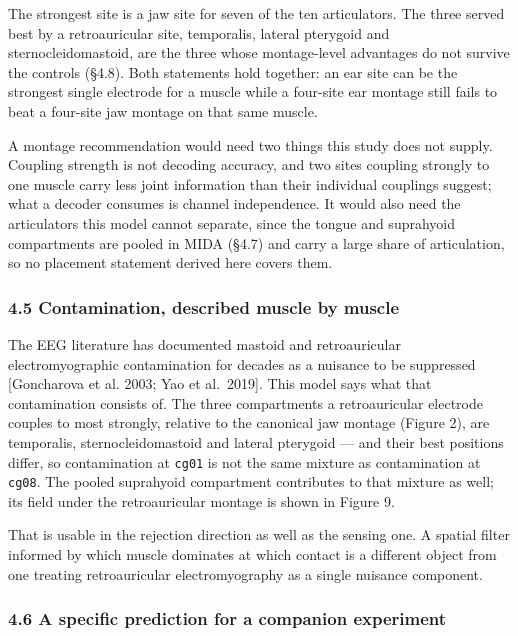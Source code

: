 \documentclass[
  11pt,
  letterpaper,
]{article}
\begin{document}
The strongest site is a jaw site for seven of the ten articulators. The three
served best by a retroauricular site, temporalis, lateral pterygoid and
sternocleidomastoid, are the three whose montage-level advantages do not survive
the controls (\S{}4.8). Both statements hold together: an ear site can be the
strongest single electrode for a muscle while a four-site ear montage still
fails to beat a four-site jaw montage on that same muscle.

A montage recommendation would need two things this study does not supply.
Coupling strength is not decoding accuracy, and two sites coupling strongly to
one muscle carry less joint information than their individual couplings suggest;
what a decoder consumes is channel independence. It would also need the
articulators this model cannot separate, since the tongue and suprahyoid
compartments are pooled in MIDA (\S{}4.7) and carry a large share of articulation,
so no placement statement derived here covers them.

\subsubsection{4.5 Contamination, described muscle by muscle}\label{contamination-described-muscle-by-muscle}

The EEG literature has documented mastoid and retroauricular electromyographic
contamination for decades as a nuisance to be suppressed {[}Goncharova et al.
2003; Yao et al.~2019{]}. This model says what that contamination consists of. The
three compartments a retroauricular electrode couples to most strongly, relative
to the canonical jaw montage (Figure 2), are temporalis, sternocleidomastoid
and lateral pterygoid --- and their best positions differ, so contamination at
\texttt{cg01} is not the same mixture as contamination at \texttt{cg08}. The pooled
suprahyoid compartment contributes to that mixture as well; its field under
the retroauricular montage is shown in Figure 9.

That is usable in the rejection direction as well as the sensing one. A spatial
filter informed by which muscle dominates at which contact is a different object
from one treating retroauricular electromyography as a single nuisance
component.

\subsubsection{4.6 A specific prediction for a companion experiment}\label{a-specific-prediction-for-a-companion-experiment}
\end{document}
